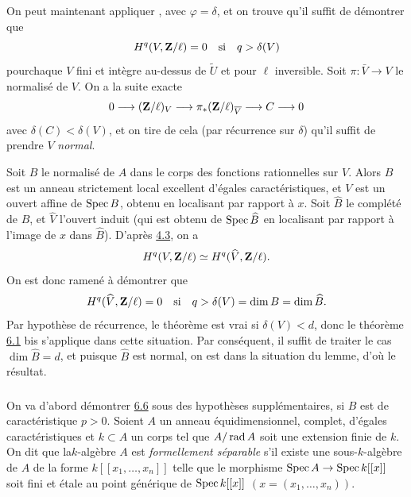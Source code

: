 \documentclass[10pt]{../fichiers-configuration-latex/smfart}
\begin{document}
On peut maintenant appliquer , avec $\varphi=\delta$, et on
trouve qu'il suffit de démontrer que
$$
H^{q}(V,\mathbf{Z}/\ell)=0\quad\text{\rm si}\quad q>\delta(V)
$$
pour\pageoriginale chaque $V$ fini et intègre au-dessus de
$\widetilde{U}$ et pour $\ell$ inversible. Soit $\pi:\bar{V}\rightarrow
V$ le normalisé de $V$. On a la suite exacte
$$
0\longrightarrow (\mathbf{Z}/\ell)_{V}\longrightarrow
\pi_{\ast}(\mathbf{Z}/\ell)_{\overline{V}}\longrightarrow C\longrightarrow 0
$$
avec $\delta(C)<\delta(V)$, et on tire de cela (par récurrence sur
$\delta$) qu'il suffit de prendre $V$ \emph{normal}.

Soit $B$ le normalisé de $A$ dans le corps des fonctions rationnelles
sur $V$. Alors $B$ est un anneau strictement local excellent d'égales
caractéristiques, et $V$ est un ouvert affine de $\operatorname{Spec} B$, obtenu en
localisant par rapport à $x$. Soit $\hat{B}$ le complété de $B$, et
$\hat{V}$ l'ouvert induit (qui est obtenu de $\operatorname{Spec} \widehat{B}$ en
localisant par rapport à l'image de $x$ dans $\hat{B}$). D'après \hyperref[XIX.cor4.3]{4.3},
on a
$$
H^{q}(V,\mathbf{Z}/\ell)\simeq H^{q}(\widehat{V},\mathbf{Z}/\ell){}.
$$
On est donc ramené à démontrer que
$$
H^{q}(\widehat{V},\mathbf{Z}/\ell)=0\quad\text{\rm si}\quad q>\delta
(V)=\dim B=\dim \widehat{B}{}.
$$
Par hypothèse de récurrence, le théorème est vrai si $\delta(V)<d$,
donc le théorème \hyperref[XIX.thm6.1]{6.1} bis s'applique dans cette situation. Par
conséquent, il suffit de traiter le cas $\dim \hat{B}=d$, et puisque
$\hat{B}$ est normal, on est dans la situation du lemme, d'où le
résultat.

\setcounter{subsection}{7}
\setcounter{subsubsection}{-1}
\subsubsection{}
On va d'abord démontrer \hyperref[XIX.lem6.6]{6.6} sous des hypothèses
supplémentaires, si 
$B$ est de caractéristique $p>0$. Soient $A$ un anneau
équidimensionnel, complet, d'égales caractéristiques et $k\subset A$ un
corps tel que $A/\operatorname{rad} A$ soit une extension finie de $k$. On dit que
la\pageoriginale $k$-algèbre $A$ est \emph{formellement séparable}
s'il existe une sous-$k$-algèbre de $A$ de la forme
$k[[x_{1},\ldots,x_{n}]]$ telle que le morphisme $\operatorname{Spec} A\rightarrow
\operatorname{Spec} k[[x]]$ soit fini et étale au point générique de $\operatorname{Spec} k[[x]]$
$(x=(x_{1},\ldots,x_{n}))$.
\end{document}
